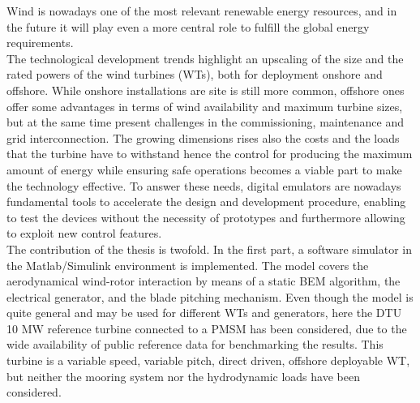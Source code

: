 Wind is nowadays one of the most relevant renewable energy resources, and in the future it will play even a more central role to fulfill the global energy requirements.\\
The technological development trends highlight an upscaling of the size and the rated powers of the wind turbines (WTs), both for deployment onshore and offshore. While onshore installations are site is still more common, offshore ones offer some advantages in terms of wind availability and maximum turbine sizes, but at the same time present challenges in the commissioning, maintenance and grid interconnection. The growing dimensions rises also the costs and the loads that the turbine have to withstand hence the control for producing the maximum amount of energy while ensuring safe operations becomes a viable part to make the technology effective. To answer these needs, digital emulators are nowadays fundamental tools to accelerate the design and development procedure, enabling to test the devices without the necessity of prototypes and furthermore allowing to exploit new control features. \\
The contribution of the thesis is twofold. In the first part, a software simulator in the Matlab/Simulink environment is implemented. The model covers the aerodynamical wind-rotor interaction by means of a static \acrfull{BEM} algorithm, the electrical generator, and the blade pitching mechanism. Even though the model is quite general and may be used for different WTs and generators, here the DTU 10 MW reference turbine connected to a \acrfull{PMSM} has been considered, due to the wide availability of public reference data for benchmarking the results. This turbine is a variable speed, variable pitch, direct driven, offshore deployable WT, but neither the mooring system nor the hydrodynamic loads have been considered.\\
